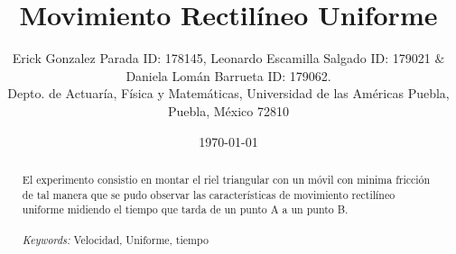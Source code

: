 \documentclass{article}
\begin{document}

\renewcommand{\footrulewidth}{1pt}
\renewcommand{\tablename}{Tabla}
\renewcommand{\figurename}{Figura}


\title{Movimiento Rectilíneo Uniforme}
\author{\small{Erick Gonzalez Parada ID: 178145, Leonardo Escamilla Salgado ID: 179021 $\&$ Daniela Lomán Barrueta ID: 179062.}\\		%
	   \small{Depto. de Actuaría, Física y Matemáticas, Universidad de las Américas Puebla, Puebla, M\'exico 72810}}
\date{\small{\today}}

\maketitle


\begin{abstract}

El experimento consistio en montar el riel triangular con un móvil con minima fricción de tal manera que se pudo observar las características de movimiento rectilíneo uniforme midiendo el tiempo que tarda de un punto A a un punto B.
\\
\\
{\it Keywords:}  Velocidad, Uniforme, tiempo
\\
\\
\end{abstract}
\end{document}

